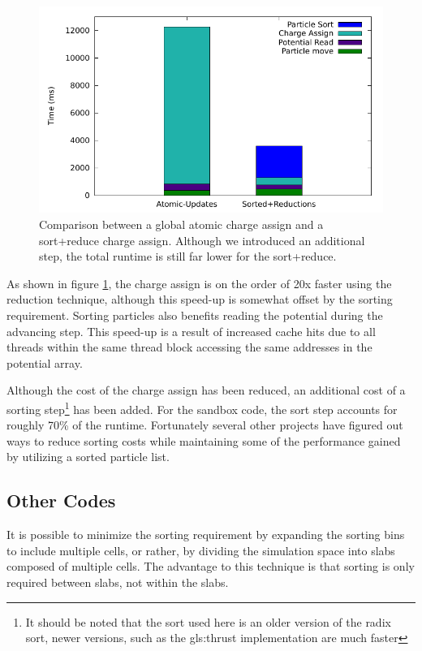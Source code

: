 \begin{figure}
\begin{center}
\includegraphics[width=5in]{design/atomic_vs_sorted.pdf}
\end{center}
\caption[Sandbox GPUPIC Charge Assign Comparison]{Comparison between a global atomic charge assign and a sort+reduce charge assign. Although we introduced an additional step, the total runtime is still far lower for the sort+reduce.}
\label{fig:GPUPIC_comparison}
\end{figure}




As shown in figure \ref{fig:GPUPIC_comparison}, the charge assign is on the order of 20x faster using the reduction technique, although this speed-up is somewhat offset by the sorting requirement. Sorting particles also benefits reading the potential during the advancing step. This speed-up is a result of increased cache hits due to all threads within the same thread block accessing the same addresses in the potential array. 

Although the cost of the charge assign has been reduced, an additional cost of a sorting step\footnote{It should be noted that the sort used here is an older version of the radix sort, newer versions, such as the \gls{gls:thrust} implementation are much faster} has been added. For the sandbox code, the sort step accounts for roughly 70\% of the runtime. Fortunately several other projects have figured out ways to reduce sorting costs while maintaining some of the performance gained by utilizing a sorted particle list. 

 
		\subsection{Other Codes}
It is possible to minimize the sorting requirement by expanding the sorting bins to include multiple cells, or rather, by dividing the simulation space into slabs composed of multiple cells. The advantage to this technique is that sorting is only required between slabs, not within the slabs.\cite{Abreu2011} 

